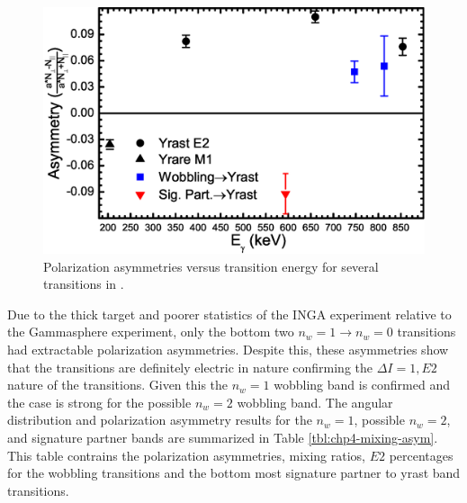 \begin{figure}[t!]
\centerline{\includegraphics[width=\textwidth]{./img/c4/AsymPlot.eps}}
	\caption{Polarization asymmetries versus transition energy for several transitions in \pr{}.\label{fig:chp4-asyms}}
\end{figure}

Due to the thick target and poorer statistics of the INGA experiment relative to the Gammasphere experiment, only the bottom two $n_w=1\rightarrow{}n_w=0$ transitions had extractable polarization asymmetries. Despite this, these asymmetries show that the transitions are definitely electric in nature confirming the $\Delta{}I=1, E2$ nature of the transitions. Given this the $n_w=1$ wobbling band is confirmed and the case is strong for the possible $n_w=2$ wobbling band. The angular distribution and polarization asymmetry results for the $n_w=1$, possible $n_w=2$, and signature partner bands are summarized in Table \ref{tbl:chp4-mixing-asym}. This table contrains the polarization asymmetries, mixing ratios, $E2$ percentages for the wobbling transitions and the bottom most signature partner to yrast band transitions. 

